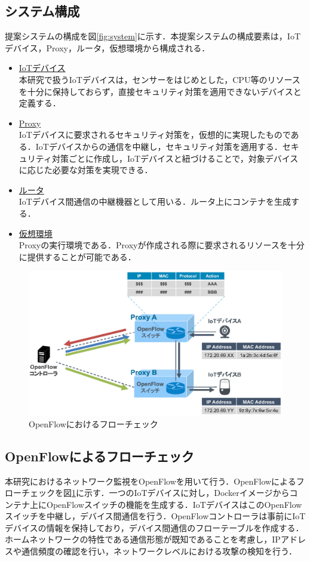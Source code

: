 \documentclass[Japanese]{dicomopapers}
\begin{document}
\subsection{システム構成}
提案システムの構成を図\ref{fig:system}に示す．本提案システムの構成要素は，IoTデバイス，Proxy，ルータ，仮想環境から構成される．
\begin{itemize}
	\item \underline{IoTデバイス}\mbox{}\\
	      本研究で扱うIoTデバイスは，センサーをはじめとした，CPU等のリソースを十分に保持しておらず，直接セキュリティ対策を適用できないデバイスと定義する．
	\item \underline{Proxy}\mbox{}\\
	      IoTデバイスに要求されるセキュリティ対策を，仮想的に実現したものである．IoTデバイスからの通信を中継し，セキュリティ対策を適用する．セキュリティ対策ごとに作成し，IoTデバイスと紐づけることで，対象デバイスに応じた必要な対策を実現できる．
	\item \underline{ルータ}\mbox{}\\
	      IoTデバイス間通信の中継機器として用いる．ルータ上にコンテナを生成する．
	\item \underline{仮想環境}\mbox{}\\
	      Proxyの実行環境である．Proxyが作成される際に要求されるリソースを十分に提供することが可能である．
\end{itemize}

\begin{figure}[!tb]
	\centering
	\includegraphics[width=\linewidth]{img/openflow.eps}
	\caption{OpenFlowにおけるフローチェック}
	\label{fig:openflow}
\end{figure}

\subsection{OpenFlowによるフローチェック}
本研究におけるネットワーク監視をOpenFlowを用いて行う．OpenFlowによるフローチェックを図\ref{fig:openflow}に示す．一つのIoTデバイスに対し，Dockerイメージからコンテナ上にOpenFlowスイッチの機能を生成する．IoTデバイスはこのOpenFlowスイッチを中継し，デバイス間通信を行う．OpenFlowコントローラは事前にIoTデバイスの情報を保持しており，デバイス間通信のフローテーブルを作成する．ホームネットワークの特性である通信形態が既知であることを考慮し，IPアドレスや通信頻度の確認を行い，ネットワークレベルにおける攻撃の検知を行う．
\end{document}
